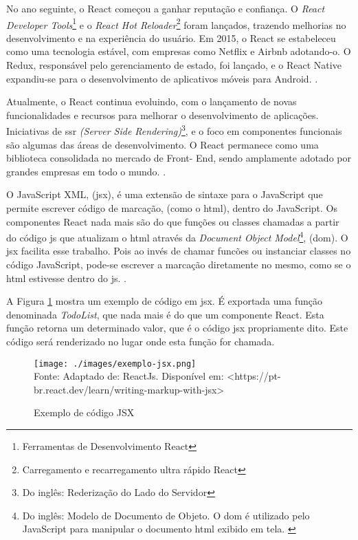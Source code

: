 No ano seguinte, o React começou a ganhar reputação e confiança. O
\textit{React Developer Tools}\footnote{Ferramentas de Desenvolvimento React
}
e o
\textit{React Hot Reloader}\footnote{Carregamento e recarregamento ultra rápido React
}
foram lançados, trazendo melhorias no
desenvolvimento e na experiência do usuário. Em 2015, o React se estabeleceu como uma
tecnologia estável, com empresas como Netflix e Airbnb adotando-o. O Redux, responsável
pelo gerenciamento de estado, foi lançado, e o React Native expandiu-se para o
desenvolvimento de aplicativos móveis para Android.
\cite{morais-react}.

Atualmente, o React continua evoluindo, com o lançamento de novas
funcionalidades e recursos para melhorar o desenvolvimento de aplicações. Iniciativas de
\acrshort{ssr}
\textit{(Server Side Rendering)}\footnote{Do inglês: Rederização do Lado do Servidor
}, e o foco em componentes funcionais são algumas das áreas de
desenvolvimento. O React permanece como uma biblioteca consolidada no mercado de Front-
End, sendo amplamente adotado por grandes empresas em todo o mundo.
\cite{morais-react}.


O JavaScript XML, (\acrshort{jsx}),
é uma extensão de sintaxe para o JavaScript que permite escrever
código de marcação, (como o \acrshort{html}),
dentro do JavaScript. Os componentes React nada mais são do que
funções ou classes chamadas a partir do código
\acrshort{js}
que atualizam o
\acrshort{html}
através da
\textit{Document Object Model}\footnote{Do inglês: Modelo de Documento de Objeto. O
    \acrshort{dom}
    é utilizado pelo JavaScript para manipular o documento
    \acrshort{html}
    exibido em tela.
    \cite{alura-dom}
 },
(\acrshort{dom}).
O
\acrshort{jsx}
facilita esse trabalho. Pois ao invés de chamar
funcões ou instanciar classes no código JavaScript,
pode-se escrever a marcação diretamente no mesmo,
como se o 
\acrshort{html}
estivesse dentro do
\acrshort{js}.
\cite{react-jsx}.

A
Figura \ref{fig:exemplo-jsx}
mostra um exemplo de código em
\acrshort{jsx}.
É exportada uma função denominada \textit{TodoList},
que nada mais é do que um componente React.
Esta função retorna um determinado valor, que é
o código
\acrshort{jsx}
propriamente dito. Este código será renderizado
no lugar onde esta função for chamada.

\begin{figure}[H]
    \centering
    \caption{Exemplo de código JSX}
    \texttt{[image: ./images/exemplo-jsx.png]}
    \label{fig:exemplo-jsx} \\
    \textnormal{\fontsize{10pt}{12pt}Fonte: Adaptado de: ReactJs. Disponível em: <https://pt-br.react.dev/learn/writing-markup-with-jsx>}
\end{figure}

